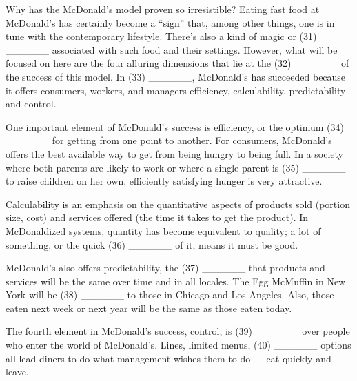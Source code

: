 \documentclass[UTF8,11pt]{ctexart}
\begin{document}
Why has the McDonald’s model proven so irresistible? Eating fast food at McDonald’s has certainly become a “sign” that, among other things, one is in tune with the contemporary lifestyle. There’s also a kind of magic or (31) \_\_\_\_\_\_ associated with such food and their settings. However, what will be focused on here are the four alluring dimensions that lie at the (32) \_\_\_\_\_\_ of the success of this model. In (33) \_\_\_\_\_\_, McDonald’s has succeeded because it offers consumers, workers, and managers efficiency, calculability, predictability and control.


One important element of McDonald’s success is efficiency, or the optimum (34) \_\_\_\_\_\_ for getting from one point to another. For consumers, McDonald’s offers the best available way to get from being hungry to being full. In a society where both parents are likely to work or where a single parent is (35) \_\_\_\_\_\_ to raise children on her own, efficiently satisfying hunger is very attractive.


Calculability is an emphasis on the quantitative aspects of products sold (portion size, cost) and services offered (the time it takes to get the product). In McDonaldized systems, quantity has become equivalent to quality; a lot of something, or the quick (36) \_\_\_\_\_\_ of it, means it must be good.


McDonald’s also offers predictability, the (37) \_\_\_\_\_\_ that products and services will be the same over time and in all locales. The Egg McMuffin in New York will be (38) \_\_\_\_\_\_ to those in Chicago and Los Angeles. Also, those eaten next week or next year will be the same as those eaten today.


The fourth element in McDonald’s success, control, is (39) \_\_\_\_\_\_ over people who enter the world of McDonald’s. Lines, limited menus, (40) \_\_\_\_\_\_ options all lead diners to do what management wishes them to do — eat quickly and leave.
\end{document}
